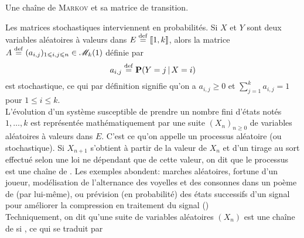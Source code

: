 
\begin{marginfigure}[3.5cm]
    \centering
    
    \caption*{\centering Une chaîne de \textsc{Markov} et sa matrice de transition.}
\end{marginfigure}

Les matrices stochastiques 
interviennent en probabilités. Si $X$ et $Y$ sont deux variables aléatoires à valeurs dans $E \overset{\mathrm{\tiny def}}{=} \llbracket 1, k \rrbracket$, alors la matrice $A \overset{\mathrm{\tiny def}}{=} (a_{i,j})_{1 \leqslant i,j \leqslant n} \in \mathscr{M}_k(1)$ définie par 
$$a_{i,j} \overset{\mathrm{\tiny def}}{=} \mathbf{P}(Y = j \,|\, X = i)$$
est stochastique, ce qui par définition signifie qu'on a $a_{i,j} \geqslant 0$ et $\sum\limits_{j=1}^k a_{i,j} = 1$ pour $1 \leqslant i \leqslant k$. \\
L'évolution d'un système susceptible de prendre un nombre fini d'états notés $1, \dots, k$ est représentée mathématiquement par une suite $(X_n)_{n \geqslant 0}$ de variables aléatoires à valeurs dans $E$. C'est ce qu'on appelle un processus aléatoire (ou stochastique). Si $X_{n+1}$ s'obtient à partir de la valeur de $X_n$ et d'un tirage au sort effectué selon une loi ne dépendant que de cette valeur, on dit que le processus est une chaîne de . Les exemples abondent: marches aléatoires, fortune d'un joueur, modélisation de l'alternance des voyelles et des consonnes dans un poème de  (par  lui-même), ou prévision (en probabilité) des états  successifs d'un signal pour améliorer la compression en traitement du signal () \\
Techniquement, on dit qu'une suite de variables aléatoires $(X_n)$ est une chaîne de  si , ce qui se traduit par
